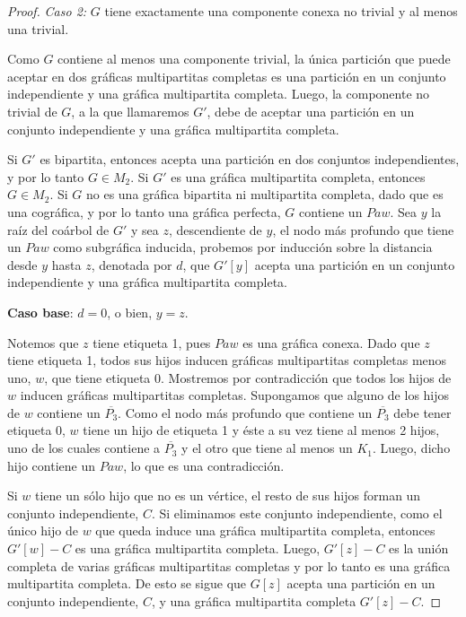 \begin{proof}
  \emph{Caso 2:} $G$ tiene exactamente una componente conexa no trivial y
  al menos una trivial.

  Como $G$ contiene al menos una componente trivial, la única partición que
  puede aceptar en dos gráficas multipartitas completas es una partición en
  un conjunto independiente y una gráfica multipartita completa. Luego, la
  componente no trivial de $G$, a la que llamaremos $G'$, debe de aceptar una
  partición en un conjunto independiente y una gráfica multipartita completa.

  Si $G'$ es bipartita, entonces acepta una partición en dos conjuntos
  independientes, y por lo tanto $G \in M_2$. Si $G'$ es una gráfica
  multipartita completa, entonces $G \in M_2$. Si $G$ no es una gráfica
  bipartita ni multipartita completa, dado que es una cográfica, y por lo
  tanto una gráfica perfecta, $G$ contiene un $Paw$. Sea $y$ la raíz del
  coárbol de $G'$ y sea $z$, descendiente de $y$, el nodo más profundo que
  tiene un $Paw$ como subgráfica inducida, probemos por inducción sobre la
  distancia desde $y$ hasta $z$, denotada por $d$, que $G'[y]$ acepta una
  partición en un conjunto independiente y una gráfica multipartita completa.

  \textbf{Caso base}: $d = 0$, o bien, $y = z$.

  Notemos que $z$ tiene etiqueta 1, pues $Paw$ es una gráfica conexa. Dado
  que $z$ tiene etiqueta 1, todos sus hijos inducen gráficas multipartitas
  completas menos uno, $w$, que tiene etiqueta 0. Mostremos por contradicción
  que todos los hijos de $w$ inducen gráficas multipartitas completas.
  Supongamos que alguno de los hijos de $w$ contiene un $\overline{P_3}$.
  Como el nodo más profundo que contiene un $\overline{P_3}$ debe tener
  etiqueta 0, $w$ tiene un hijo de etiqueta 1 y éste a su vez tiene al menos
  2 hijos, uno de los cuales contiene a $\overline{P_3}$ y el otro que tiene
  al menos un $K_1$. Luego, dicho hijo contiene un $Paw$, lo que es una
  contradicción.

  Si $w$ tiene un sólo hijo que no es un vértice, el resto de sus hijos
  forman un conjunto independiente, $C$. Si eliminamos este conjunto
  independiente, como el único hijo de $w$ que queda induce una gráfica
  multipartita completa, entonces $G'[w] - C$ es una gráfica multipartita
  completa. Luego, $G'[z] - C$ es la unión completa de varias gráficas
  multipartitas completas y por lo tanto es una gráfica multipartita
  completa. De esto se sigue que $G[z]$ acepta una partición en un conjunto
  independiente, $C$, y una gráfica multipartita completa $G'[z] - C$.


\end{proof}
